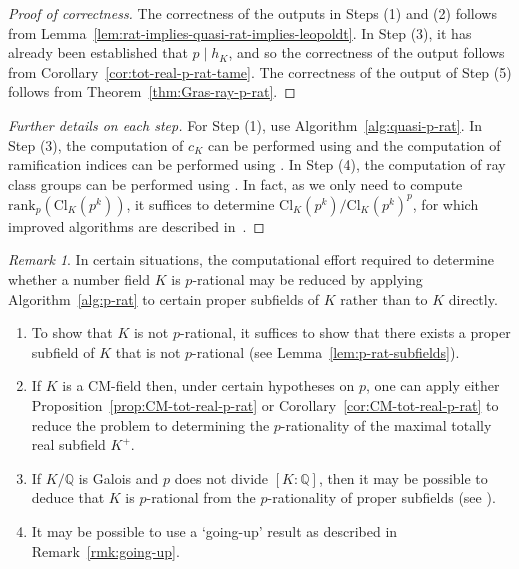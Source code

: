 \documentclass[12pt, a4paper, usenames]{amsart}
\newcommand{\Q}{\mathbb{Q}}
\theoremstyle{plain}
\theoremstyle{remark}
\newtheorem{remark}[theorem]{Remark}
\theoremstyle{definition}
\newcommand{\rank}{\mathrm{rank}}
\newcommand{\Cl}{\mathrm{Cl}}
\begin{document}
\begin{proof}[Proof of correctness]
The correctness of the outputs in Steps (1) and (2) follows from 
Lemma~\ref{lem:rat-implies-quasi-rat-implies-leopoldt}. 
In Step (3), it has already been established that $p \mid h_{K}$, and
so the correctness of the output follows from Corollary~\ref{cor:tot-real-p-rat-tame}. The correctness of the output of Step (5) follows from Theorem~\ref{thm:Gras-ray-p-rat}.
\end{proof}

\begin{proof}[Further details on each step]
For Step (1), use Algorithm~\ref{alg:quasi-p-rat}.
In Step (3), the computation of $c_{K}$ can be performed using
\cite[Algorithm~4.1.11]{MR1228206} and the
computation of ramification indices can be performed
using \cite[Algorithm~6.2.9]{MR1228206}.
In Step (4), the computation of ray class groups can be performed using
\cite[Algorithm~4.3.1]{MR1728313}. 
In fact, as we only need to compute  $\rank_{p}(\Cl_{K}(p^{k}))$, it suffices to determine $\Cl_{K}(p^{k})/\Cl_{K}(p^{k})^{p}$, for which improved algorithms are described in~\cite[\S 3]{MR3952015}.
\end{proof}

\begin{remark}
In certain situations, the computational effort required to determine whether 
a number field $K$ is $p$-rational may be reduced by applying 
Algorithm~\ref{alg:p-rat} to certain proper subfields of $K$ rather than
to $K$ directly. 
\begin{enumerate}
    \item To show that $K$ is not $p$-rational, it suffices to show that there exists a proper subfield of $K$ that is not $p$-rational (see Lemma~\ref{lem:p-rat-subfields}).
    \item If $K$ is a CM-field then, under certain hypotheses on $p$, one can apply
    either Proposition~\ref{prop:CM-tot-real-p-rat} or Corollary~\ref{cor:CM-tot-real-p-rat} to reduce the problem to determining the $p$-rationality of the maximal totally real subfield $K^{+}$.
    \item If $K/\Q$ is Galois and $p$ does not divide $[K:\Q]$, then 
    it may be possible to deduce that $K$ is $p$-rational from the $p$-rationality of proper subfields (see \cite[\S 3.3]{MR3512524}). 
    \item It may be possible to use a `going-up' result as described in Remark~\ref{rmk:going-up}.
\end{enumerate}
\end{remark}
\end{document}
